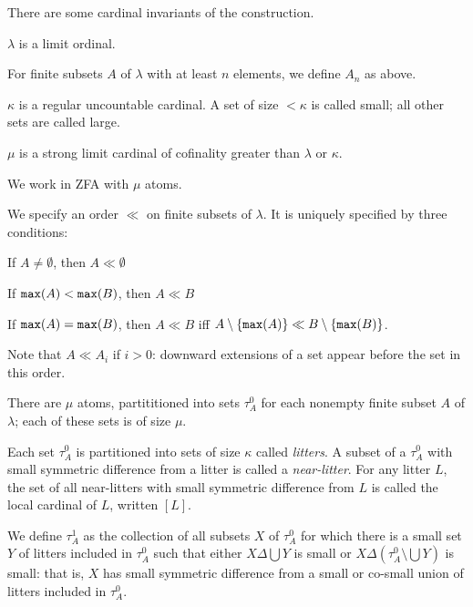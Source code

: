 \documentclass{slides}
\begin{document}
\begin{slide}

There are some cardinal invariants of the construction.

$\lambda$ is a limit ordinal.

For finite subsets $A$ of $\lambda$ with at least $n$ elements, we define $A_n$ as above.

$\kappa$ is a regular uncountable cardinal.  A set of size $<\kappa$ is called small;  all other sets are called large.

$\mu$ is a strong limit cardinal of cofinality greater than $\lambda$ or $\kappa$.

We work in ZFA with $\mu$ atoms.

\end{slide}

\begin{slide}

We specify an order $\ll$ on finite subsets of $\lambda$.    It is uniquely specified by three conditions:

\begin{description}

\item  If $A \neq \emptyset$, then $A \ll \emptyset$

\item  If ${\tt max}(A) < {\tt max}(B)$, then $A \ll B$

\item  If ${\tt max}(A) = {\tt max}(B)$, then $A \ll B$ iff $A \setminus \{{\tt max}(A)\} \ll B \setminus \{{\tt max}(B)\}$.

\end{description}

Note that $A \ll A_i$ if $i>0$:  downward extensions of a set appear before the set in this order.

\end{slide}

\begin{slide}

There are $\mu$ atoms, partititioned into sets $\tau^0_A$ for each nonempty finite subset $A$ of $\lambda$;  each of these sets is of size $\mu$.

Each set $\tau^0_A$ is partitioned into sets of size $\kappa$ called {\em litters\/}.  A subset of a $\tau^0_A$  with small symmetric difference from a litter is called a {\em near-litter\/}.  For any litter $L$, the set of all near-litters with small symmetric difference from $L$ is called the local cardinal of $L$, written $[L]$.

We define $\tau^1_A$ as the collection of all subsets $X$ of $\tau^0_A$ for which there is a small set $Y$  of litters included in $\tau^0_A$ such that either
$X \Delta \bigcup Y$ is small or $X \Delta (\tau^0_A \setminus \bigcup Y)$ is small:  that is, $X$ has small symmetric difference from a small or co-small union of litters
included in $\tau^0_A$.

\end{slide}
\end{document}

